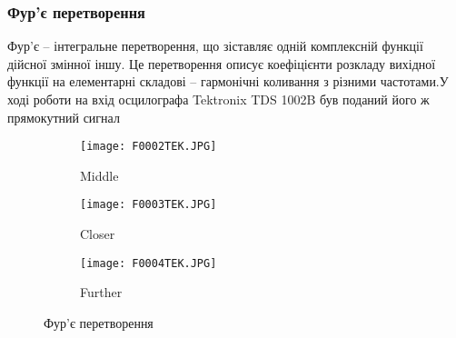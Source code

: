 \documentclass[a4paper,12pt]{article}
\begin{document}
\subsubsection{Фур’є перетворення}
\par{} Фур’є – інтегральне перетворення, що зіставляє одній комплексній функції дійсної змінної іншу. Це перетворення описує коефіцієнти розкладу вихідної функції на елементарні складові – гармонічні коливання з різними частотами.У ході роботи на вхід осцилографа Tektronix TDS 1002B був поданий його ж прямокутний сигнал
\par\quad\begin{figure}[!h]
  \centering
  \begin{subfigure}[b]{0.3\linewidth}
    \texttt{[image: F0002TEK.JPG]}
    \caption{Middle}
  \end{subfigure}
  \begin{subfigure}[b]{0.3\linewidth}
    \texttt{[image: F0003TEK.JPG]}
    \caption{Closer}
  \end{subfigure}
  \begin{subfigure}[b]{0.3\linewidth}
    \texttt{[image: F0004TEK.JPG]}
    \caption{Further}
  \end{subfigure}
  \caption{Фур'є перетворення}
\end{figure}
\clearpage
\end{document}
